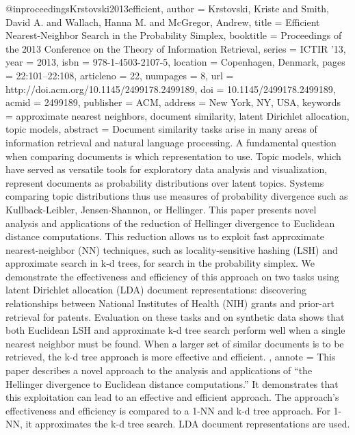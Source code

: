 @inproceedings{Krstovski2013efficient,
	author = {Krstovski, Kriste and Smith, David A. and Wallach, Hanna M. and McGregor, Andrew},
	title = {Efficient Nearest-Neighbor Search in the Probability Simplex},
	booktitle = {Proceedings of the 2013 Conference on the Theory of Information Retrieval},
	series = {ICTIR '13},
	year = {2013},
	isbn = {978-1-4503-2107-5},
	location = {Copenhagen, Denmark},
	pages = {22:101--22:108},
	articleno = {22},
	numpages = {8},
	url = {http://doi.acm.org/10.1145/2499178.2499189},
	doi = {10.1145/2499178.2499189},
	acmid = {2499189},
	publisher = {ACM},
	address = {New York, NY, USA},
	keywords = {approximate nearest neighbors, document similarity, latent Dirichlet allocation, topic models},
	abstract = {Document similarity tasks arise in many areas of information retrieval and natural language processing. A fundamental question when comparing documents is which representation to use. Topic models, which have served as versatile tools for exploratory data analysis and visualization, represent documents as probability distributions over latent topics. Systems comparing topic distributions thus use measures of probability divergence such as Kullback-Leibler, Jensen-Shannon, or Hellinger. This paper presents novel analysis and applications of the reduction of Hellinger divergence to Euclidean distance computations. This reduction allows us to exploit fast approximate nearest-neighbor (NN) techniques, such as locality-sensitive hashing (LSH) and approximate search in k-d trees, for search in the probability simplex. We demonstrate the effectiveness and efficiency of this approach on two tasks using latent	Dirichlet allocation (LDA) document representations: discovering	relationships between National Institutes of Health (NIH) grants	and prior-art retrieval for patents. Evaluation on these tasks and on	synthetic data shows that both Euclidean LSH and approximate k-d tree search perform well when a single nearest neighbor must be	found. When a larger set of similar documents is to be retrieved,	the k-d tree approach is more effective and efficient. },
	annote = {This paper describes a novel approach to the analysis and applications of ``the Hellinger divergence to Euclidean distance computations.'' It demonstrates that this exploitation can lead to an effective and efficient approach. The approach's effectiveness and efficiency is compared to a 1-NN and k-d tree approach. For 1-NN, it approximates the k-d tree search. LDA document representations are used.}
}

